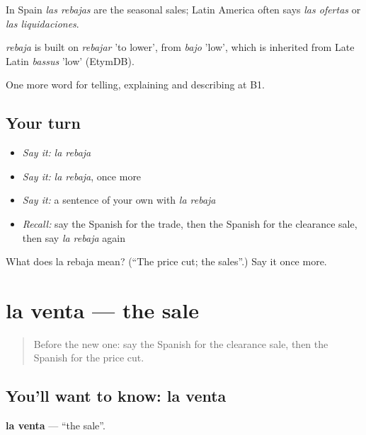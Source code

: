 In Spain \emph{las rebajas} are the seasonal sales; Latin America often says \emph{las ofertas} or \emph{las liquidaciones}.

\begin{cousinweb}
\emph{rebaja} is built on \emph{rebajar} 'to lower', from \emph{bajo} 'low', which is inherited from Late Latin \emph{bassus} 'low' (EtymDB).
\end{cousinweb}

\begin{grammarlens}[title={What you've built}]
One more word for telling, explaining and describing at B1.
\end{grammarlens}

\subsection*{Your turn}
\begin{itemize}
\raggedright
  \item \emph{Say it:} \emph{la rebaja}
  \item \emph{Say it:} \emph{la rebaja}, once more
  \item \emph{Say it:} a sentence of your own with \emph{la rebaja}
  \item \emph{Recall:} say the Spanish for the trade, then the Spanish for the clearance sale, then say \emph{la rebaja} again
\end{itemize}

\begin{tcolorbox}[breakable,colback=teal!4,colframe=teal!35!black,title={Before you move on}]
What does la rebaja mean? (\textquotedblleft{}The price cut; the sales\textquotedblright{}.) Say it once more.
\end{tcolorbox}
\section[la venta]{la venta — the sale}

\label{lesson:ES-C631-venta}



\begin{quote}
Before the new one: say the Spanish for the clearance sale, then the Spanish for the price cut.
\end{quote}

\subsection*{You'll want to know: la venta}
\textbf{la venta} — \textquotedblleft{}the sale\textquotedblright{}.

